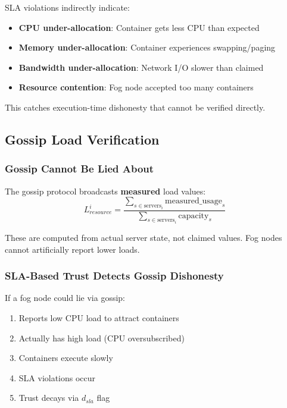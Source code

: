 \documentclass[12pt,a4paper]{article}
\begin{document}
SLA violations indirectly indicate:
\begin{itemize}
    \item \textbf{CPU under-allocation}: Container gets less CPU than expected
    \item \textbf{Memory under-allocation}: Container experiences swapping/paging
    \item \textbf{Bandwidth under-allocation}: Network I/O slower than claimed
    \item \textbf{Resource contention}: Fog node accepted too many containers
\end{itemize}

This catches execution-time dishonesty that cannot be verified directly.

\subsection{Gossip Load Verification}

\subsubsection{Gossip Cannot Be Lied About}

The gossip protocol broadcasts \textbf{measured} load values:
\begin{equation}
    L_{resource}^i = \frac{\sum_{s \in \text{servers}_i} \text{measured\_usage}_s}{\sum_{s \in \text{servers}_i} \text{capacity}_s}
\end{equation}

These are computed from actual server state, not claimed values. Fog nodes cannot artificially report lower loads.

\subsubsection{SLA-Based Trust Detects Gossip Dishonesty}

If a fog node could lie via gossip:
\begin{enumerate}
    \item Reports low CPU load to attract containers
    \item Actually has high load (CPU oversubscribed)
    \item Containers execute slowly
    \item SLA violations occur
    \item Trust decays via $d_{sla}$ flag
\end{enumerate}
\end{document}
